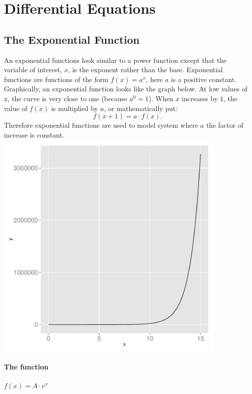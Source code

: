 \documentclass[a4paper]{report}
\begin{document}

\section{Differential Equations}

\subsection{The Exponential Function}

An exponential functions look similar to a power function except that the variable of interest, $x$, is the exponent rather than the base. Exponential functions are functions of the form $f(x)=a^x$, here $a$ is a positive constant. Graphically, an exponential function looks like the graph below. At low values of x, the curve is very close to one (because $a^0=1$). When $x$ increases by $1$, the value of $f(x)$ is multiplied by $a$, or mathematically put:
\begin{equation}
f(x+1) = a \cdot f(x).
\end{equation}
Therefore exponential functions are used to model system where $a$ the factor of increase is constant.\\ 
\includegraphics[width=0.85\textwidth]{exponential_plot.pdf}\\


\paragraph{The function} $f(x) = A \cdot e^x$
\end{document}

